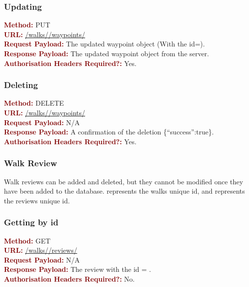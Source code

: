 \documentclass[11pt,a4paper]{report}
\begin{document}
\subsubsection{Updating}
\textbf{\textcolor{Maroon}{Method:}} PUT\\
\textbf{\textcolor{Maroon}{URL:}} \url{/walks/}\url{/waypoints/}\\
\textbf{\textcolor{Maroon}{Request Payload:}} The updated waypoint object (With the id=).\\
\textbf{\textcolor{Maroon}{Response Payload:}} The updated waypoint object from the server.\\
\textbf{\textcolor{Maroon}{Authorisation Headers Required?:}} Yes.

\subsubsection{Deleting}
\textbf{\textcolor{Maroon}{Method:}} DELETE\\
\textbf{\textcolor{Maroon}{URL:}} \url{/walks/}\url{/waypoints/}\\
\textbf{\textcolor{Maroon}{Request Payload:}} N/A\\
\textbf{\textcolor{Maroon}{Response Payload:}} A confirmation of the deletion \{``success'':true\}.\\
\textbf{\textcolor{Maroon}{Authorisation Headers Required?:}} Yes.

\subsubsection{Walk Review}

Walk reviews can be added and deleted, but they cannot be modified once they have been added to the database.  represents the walks unique id, and  represents the reviews unique id.

\subsubsection{Getting by id}
\textbf{\textcolor{Maroon}{Method:}} GET\\
\textbf{\textcolor{Maroon}{URL:}} \url{/walks/}\url{/reviews/}\\
\textbf{\textcolor{Maroon}{Request Payload:}} N/A\\
\textbf{\textcolor{Maroon}{Response Payload:}} The review with the id = .\\
\textbf{\textcolor{Maroon}{Authorisation Headers Required?:}} No.
\end{document}
